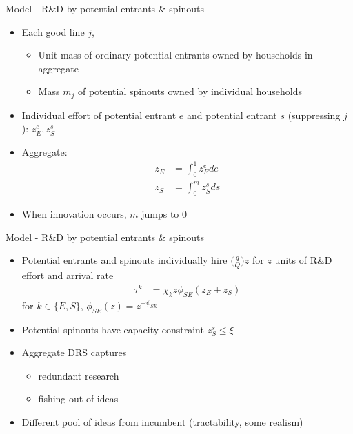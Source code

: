 \documentclass[english,usenames,dvipsnames]{beamer}
\begin{document}
\begin{frame}{Model - R\&D by potential entrants \& spinouts}
\begin{itemize}
	\item Each good line $j$,
	\begin{itemize}
		\item Unit mass of ordinary \alert{potential entrants} owned by households in aggregate
		\item Mass $m_j$ of \alert{potential spinouts} owned by individual households
	\end{itemize}
	\item Individual effort of potential entrant $e$ and potential entrant $s$ (suppressing $j$): $z_E^e, z_S^s$ 
	\item Aggregate: 
	\begin{align*}
		z_E &= \int_0^1 z_E^e de \\
		z_S &= \int_0^m z_S^s ds 
	\end{align*}
	\item When innovation occurs, \alert{$m$ jumps to 0}
\end{itemize}
\end{frame}


\begin{frame}{Model - R\&D by potential entrants \& spinouts}
\begin{itemize}
	\item Potential entrants and spinouts individually hire $\big(\frac{q}{Q}\big)z$ for $z$ units of R\&D effort and arrival rate  
	\begin{align*}
	\tau^k &= \chi_{k} z \phi_{SE} (z_E + z_S)
	\end{align*}
	for $k \in \{E,S\}$, $\phi_{SE}(z) = z^{-\psi_{SE}}$
	\item Potential spinouts have \alert{capacity constraint} $z_S^s \le \xi$
	\item Aggregate DRS captures
	\begin{itemize}
		\item \alert{redundant} research
		\item fishing out of ideas
	\end{itemize} 
	\item \alert{Different pool of ideas} from incumbent (tractability, some realism)
\end{itemize}
\end{frame}
\end{document}
